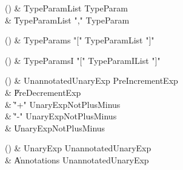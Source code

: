 \begin{bbgrammarappendix}

() & TypeParamList \label{prod:TypeParamList}  \: TypeParam  \\

 &    \| TypeParamList \xcd"," TypeParam \\

\end{bbgrammarappendix}

\begin{bbgrammarappendix}

() & TypeParams \label{prod:TypeParams}  \: \xcd"[" TypeParamList \xcd"]"  \\


\end{bbgrammarappendix}

\begin{bbgrammarappendix}

() & TypeParamsI \label{prod:TypeParamsI}  \: \xcd"[" TypeParamIList \xcd"]"  \\


\end{bbgrammarappendix}

\begin{bbgrammarappendix}

() & UnannotatedUnaryExp \label{prod:UnannotatedUnaryExp}  \: PreIncrementExp  \\

 &    \| PreDecrementExp \\
 &    \| \xcd"+" UnaryExpNotPlusMinus \\
 &    \| \xcd"-" UnaryExpNotPlusMinus \\
 &    \| UnaryExpNotPlusMinus \\

\end{bbgrammarappendix}

\begin{bbgrammarappendix}

() & UnaryExp \label{prod:UnaryExp}  \: UnannotatedUnaryExp  \\

 &    \| Annotations UnannotatedUnaryExp \\

\end{bbgrammarappendix}

